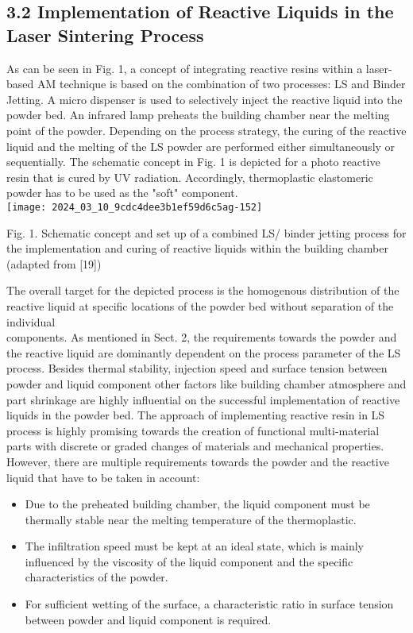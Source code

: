 \documentclass[10pt]{article}
\begin{document}
\subsection*{3.2 Implementation of Reactive Liquids in the Laser Sintering Process}
As can be seen in Fig. 1, a concept of integrating reactive resins within a laser-based AM technique is based on the combination of two processes: LS and Binder Jetting. A micro dispenser is used to selectively inject the reactive liquid into the powder bed. An infrared lamp preheats the building chamber near the melting point of the powder. Depending on the process strategy, the curing of the reactive liquid and the melting of the LS powder are performed either simultaneously or sequentially. The schematic concept in Fig. 1 is depicted for a photo reactive resin that is cured by UV radiation. Accordingly, thermoplastic elastomeric powder has to be used as the "soft" component.\\
\texttt{[image: 2024\_03\_10\_9cdc4dee3b1ef59d6c5ag-152]}

Fig. 1. Schematic concept and set up of a combined LS/ binder jetting process for the implementation and curing of reactive liquids within the building chamber (adapted from [19])

The overall target for the depicted process is the homogenous distribution of the reactive liquid at specific locations of the powder bed without separation of the individual\\
components. As mentioned in Sect. 2, the requirements towards the powder and the reactive liquid are dominantly dependent on the process parameter of the LS process. Besides thermal stability, injection speed and surface tension between powder and liquid component other factors like building chamber atmosphere and part shrinkage are highly influential on the successful implementation of reactive liquids in the powder bed. The approach of implementing reactive resin in LS process is highly promising towards the creation of functional multi-material parts with discrete or graded changes of materials and mechanical properties. However, there are multiple requirements towards the powder and the reactive liquid that have to be taken in account:

\begin{itemize}
  \item Due to the preheated building chamber, the liquid component must be thermally stable near the melting temperature of the thermoplastic.

  \item The infiltration speed must be kept at an ideal state, which is mainly influenced by the viscosity of the liquid component and the specific characteristics of the powder.

  \item For sufficient wetting of the surface, a characteristic ratio in surface tension between powder and liquid component is required.

\end{itemize}
\end{document}
